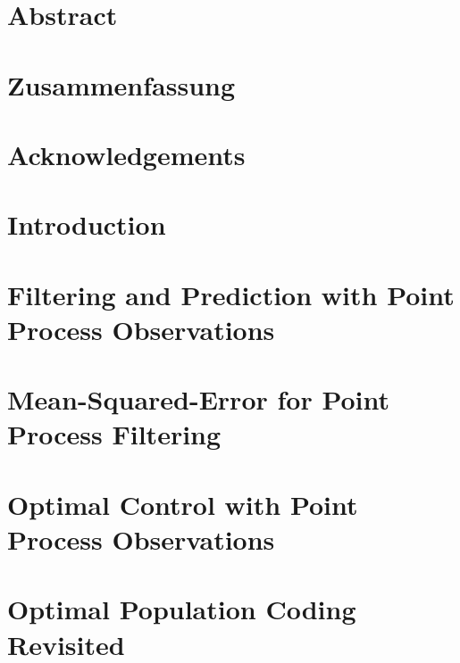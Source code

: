 \documentclass[justified,a4paper]{tufte-book}
\author{Alex Kunze Susemihl}
\date{Summer 2014}
\begin{document}

\morefloats
{
\chapter*{Abstract}



\chapter*{Zusammenfassung}


}
\chapter*{Acknowledgements}



\setcounter{tocdepth}{2}
\setcounter{secnumdepth}{1}
\tableofcontents


\chapter{Introduction}

\label{chap:intro}



\chapter{Filtering and Prediction with Point Process Observations}

\label{chap:filtering}



\chapter{Mean-Squared-Error for Point Process Filtering}

\label{chap:mse}



\chapter{Optimal Control with Point Process Observations}

\label{chap:control}



\chapter{Optimal Population Coding Revisited}
\end{document}
